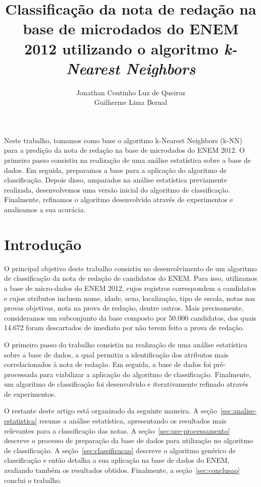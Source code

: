 \documentclass[12pt]{article}
\title{Classificação da nota de redação na base de microdados do ENEM 2012 utilizando o algoritmo \emph{k-Nearest Neighbors}}
\author{Jonathan Coutinho Luz de Queiroz\inst{1} \\ Guilherme Lima Bernal\inst{1}}
\begin{document}
\maketitle

\begin{resumo}
Neste trabalho, tomamos como base o algoritmo k-Nearest Neighbors (k-NN) para a predição da nota de redação na base de microdados do ENEM 2012.
O primeiro passo consistiu na realização de uma análise estatística sobre a base de dados.
Em seguida, preparamos a base para a aplicação do algoritmo de classificação.
Depois disso, amparados na análise estatística previamente realizada, desenvolvemos uma versão inicial do algoritmo de classificação.
Finalmente, refinamos o algoritmo desenvolvido através de experimentos e analisamos a sua acurácia.
\end{resumo}

\section{Introdução}
\label{sec:intro}
O principal objetivo deste trabalho consistiu no desenvolvimento de um algoritmo de classificação da nota de redação de candidatos do ENEM.
Para isso, utilizamos a base de micro-dados do ENEM 2012, cujos registros correspondem a candidatos e cujos atributos incluem nome, idade, sexo, localização, tipo de escola, notas nas provas objetivas, nota na prova de redação, dentre outros.
Mais precisamente, consideramos um subconjunto da base composto por 50.000 candidatos, dos quais 14.672 foram descartados de imediato por não terem feito a prova de redação.

O primeiro passo do trabalho consistiu na realização de uma análise estatística sobre a base de dados, a qual permitiu a identificação dos atributos mais correlacionados à nota de redação.
Em seguida, a base de dados foi pré-processada para viabilizar a aplicação do algoritmo de classificação.
Finalmente, um algoritmo de classificação foi desenvolvido e iterativamente refinado através de experimentos.

O restante deste artigo está organizado da seguinte maneira.
A seção~\ref{sec:analise-estatistica} resume a análise estatística, apresentando os resultados mais relevantes para a classificação das notas.
A seção~\ref{sec:pre-processamento} descreve o processo de preparação da base de dados para utilização no algoritmo de classificação.
A seção~\ref{sec:classificacao} descreve o algoritmo genérico de classificação e então detalha a sua aplicação na base de dados do ENEM, avaliando também os resultados obtidos.
Finalmente, a seção~\ref{sec:conclusao} conclui o trabalho.
\end{document}
